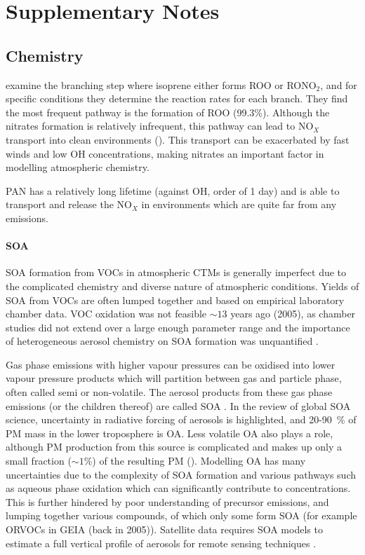 
\chapter{Supplementary Notes}
  
  \section{Chemistry}
    
    \cite{Patchen2007} examine the branching step where isoprene either forms ROO or RONO$_2$, and for specific conditions they determine the reaction rates for each branch.
    They find the most frequent pathway is the formation of ROO (99.3\%).
    Although the nitrates formation is relatively infrequent, this pathway can lead to NO$_X$ transport into clean environments (\cite{Horowitz1998}).
    This transport can be exacerbated by fast winds and low OH concentrations, making nitrates an important factor in modelling atmospheric chemistry.
    
    PAN has a relatively long lifetime (against OH, order of 1 day) and is able to transport and release the NO$_X$ in environments which are quite far from any emissions.
    
    \subsubsection{SOA}
    \label{LR:VOCs:IsopCascade:SOA}
    
    SOA formation from VOCs in atmospheric CTMs is generally imperfect due to the complicated chemistry and diverse nature of atmospheric conditions.
    Yields of SOA from VOCs are often lumped together and based on empirical laboratory chamber data. 
    VOC oxidation was not feasible $\sim 13$ years ago (2005), as chamber studies did not extend over a large enough parameter range and the importance of heterogeneous aerosol chemistry on SOA formation was unquantified \citep{Kanakidou2005}.
    
    
    Gas phase emissions with higher vapour pressures can be oxidised into lower vapour pressure products which will partition between gas and particle phase, often called semi or non-volatile. 
    The aerosol products from these gas phase emissions (or the children thereof) are called SOA \citep{Kanakidou2005}.
    In the \cite{Kanakidou2005} review of global SOA science, uncertainty in radiative forcing of aerosols is highlighted, and 20-90~\% of PM mass in the lower troposphere is OA.
    Less volatile OA also plays a role, although PM production from this source is complicated and makes up only a small fraction ($\sim 1 \%$) of the resulting PM (\cite{Kroll2008, Bei2012}).
    Modelling OA has many uncertainties due to the complexity of SOA formation and various pathways such as aqueous phase oxidation which can significantly contribute to concentrations.
    This is further hindered by poor understanding of precursor emissions, and lumping together various compounds, of which only some form SOA (for example ORVOCs in GEIA (back in 2005)).
    Satellite data requires SOA models to estimate a full vertical profile of aerosols for remote sensing techniques \citep{Kanakidou2005}.
    
